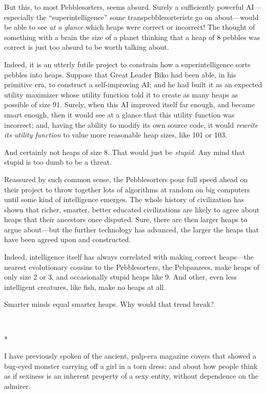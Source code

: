 {
 But this, to most Pebblesorters, seems absurd. Surely a
sufficiently powerful AI---especially the
``superintelligence'' some
transpebblesorterists go on about---would be able to see \textit{at a
glance} which heaps were correct or incorrect! The thought of something
with a brain the size of a planet thinking that a heap of 8 pebbles was
correct is just too absurd to be worth talking about.}

{
 Indeed, it is an utterly futile project to constrain how a
superintelligence sorts pebbles into heaps. Suppose that Great Leader
Biko had been able, in his primitive era, to construct a self-improving
AI; and he had built it as an expected utility maximizer whose utility
function told it to create as many heaps as possible of size 91.
Surely, when this AI improved itself far enough, and became smart
enough, then it would see at a glance that this utility function was
incorrect; and, having the ability to modify its own source code, it
would \textit{rewrite its utility function} to value more reasonable
heap sizes, like 101 or 103.}

{
 And certainly not heaps of size 8. That would just be
\textit{stupid.} Any mind that stupid is too dumb to be a threat.}

{
 Reassured by such common sense, the Pebblesorters pour full speed
ahead on their project to throw together lots of algorithms at random
on big computers until some kind of intelligence emerges. The whole
history of civilization has shown that richer, smarter, better educated
civilizations are likely to agree about heaps that their ancestors once
disputed. Sure, there are then larger heaps to argue about---but the
further technology has advanced, the larger the heaps that have been
agreed upon and constructed.}

{
 Indeed, intelligence itself has always correlated with making
correct heaps---the nearest evolutionary cousins to the Pebblesorters,
the Pebpanzees, make heaps of only size 2 or 3, and occasionally stupid
heaps like 9. And other, even less intelligent creatures, like fish,
make no heaps at all.}

{
 Smarter minds equal smarter heaps. Why would that trend break?}

{\centering
 \ ~
\par}

{\centering
 *
\par}


{
 I have previously spoken of the ancient, pulp-era magazine covers
that showed a bug-eyed monster carrying off a girl in a torn dress; and
about how people think as if sexiness is an inherent property of a sexy
entity, without dependence on the admirer. }

